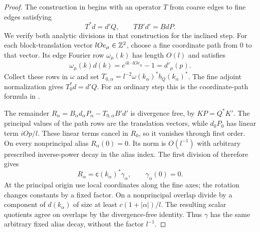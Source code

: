 \begin{proof}
The construction in  begins with an operator $T$
from coarse edges to fine edges satisfying
\begin{equation}
 T^*d=d'Q,\qquad TB'd'=BdP.
 \label{eq:free-edge-identities}
\end{equation}
We verify both analytic divisions in that construction for the inclined
step.  For each block-translation vector $lOe_\mu\in\mathbb Z^2$, choose a
fine coordinate path from $0$ to that vector.  Its edge Fourier row
$\omega_\mu(k)$ has length $O(l)$ and satisfies
\[
 \omega_\mu(k)d(k)=e^{ik\cdot lOe_\mu}-1=d'_\mu(p).
\]
Collect these rows in $\omega$ and set
$T_{0,\alpha}=l^{-2}\omega(k_\alpha)^*b_Q(k_\alpha)^*$.
The fine adjoint normalization gives $T_0^*d=d'Q$.
For an ordinary step this is the coordinate-path formula in
.

The remainder
$R_\alpha=B_\alpha d_\alpha P_\alpha-T_{0,\alpha}B'd'$
is divergence free, by $KP=Q^*K'$.
The principal values of the path rows are the translation vectors,
while $d_0P_0$ has linear term $iOp/l$.  These linear terms cancel
in $R_0$, so it vanishes through first order.  On every nonprincipal
alias $R_\alpha(0)=0$.  Its norm is $O(l^{-1})$ with arbitrary
prescribed inverse-power decay in the alias index.
The first division of  therefore gives
\[
 R_\alpha=\mathsf c(k_\alpha)^*\gamma_\alpha,
 \qquad \gamma_\alpha(0)=0.
\]
At the principal origin use local coordinates along the fine axes;
the rotation changes constants by a fixed factor.  On a nonprincipal
overlap divide by a component of $d(k_\alpha)$ of size at least
$c(1+|\alpha|)/l$.  The resulting scalar quotients agree on overlaps
by the divergence-free identity.  Thus $\gamma$ has the same arbitrary
fixed alias decay, without the factor $l^{-1}$.


\end{proof}
